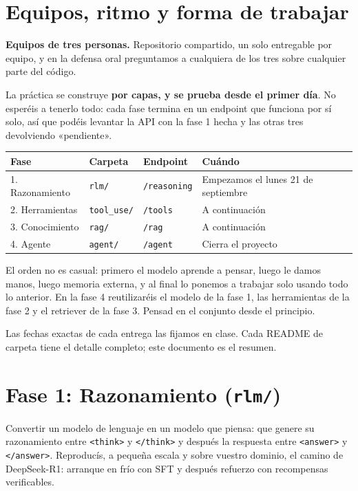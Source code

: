 \documentclass[11pt,a4paper]{article}
\newcommand{\code}[1]{{\small\texttt{#1}}}
\newcommand{\file}[1]{{\small\texttt{\textcolor{arcablue}{#1}}}}
\begin{document}
\section{Equipos, ritmo y forma de trabajar}

\textbf{Equipos de tres personas.} Repositorio compartido, un solo entregable por equipo, y
en la defensa oral preguntamos a cualquiera de los tres sobre cualquier parte del código.

La práctica se construye \textbf{por capas, y se prueba desde el primer día}. No esperéis a
tenerlo todo: cada fase termina en un endpoint que funciona por sí solo, así que podéis
levantar la API con la fase 1 hecha y las otras tres devolviendo «pendiente».

\begin{center}
\small
\begin{tabularx}{\textwidth}{@{}l l l X@{}}
\toprule
\textbf{Fase} & \textbf{Carpeta} & \textbf{Endpoint} & \textbf{Cuándo} \\
\midrule
1. Razonamiento   & \file{rlm/}      & \code{/reasoning}  & Empezamos el lunes 21 de septiembre \\
2. Herramientas   & \file{tool\_use/}& \code{/tools}      & A continuación \\
3. Conocimiento   & \file{rag/}      & \code{/rag}        & A continuación \\
4. Agente         & \file{agent/}    & \code{/agent}      & Cierra el proyecto \\
\bottomrule
\end{tabularx}
\end{center}

El orden no es casual: primero el modelo aprende a pensar, luego le damos manos, luego memoria
externa, y al final lo ponemos a trabajar solo usando todo lo anterior. En la fase 4
reutilizaréis el modelo de la fase 1, las herramientas de la fase 2 y el retriever de la
fase 3. Pensad en el conjunto desde el principio.

Las fechas exactas de cada entrega las fijamos en clase. Cada README de carpeta tiene el
detalle completo; este documento es el resumen.

\section{Fase 1: Razonamiento (\file{rlm/})}

Convertir un modelo de lenguaje en un modelo que piensa: que genere su razonamiento entre
\code{<think>} y \code{</think>} y después la respuesta entre \code{<answer>} y
\code{</answer>}. Reproducís, a pequeña escala y sobre vuestro dominio, el camino de
DeepSeek-R1: arranque en frío con SFT y después refuerzo con recompensas verificables.
\end{document}
